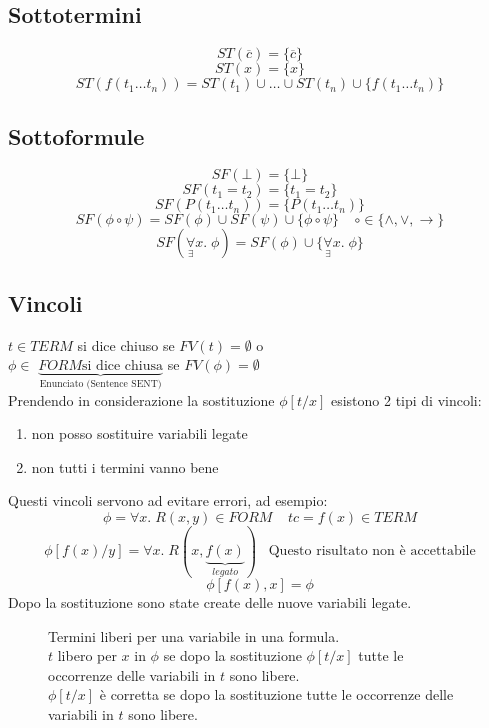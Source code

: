 \documentclass{article}
\theoremstyle{break}
\theoremstyle{break}
\theoremstyle{break}
\theoremstyle{break}
\begin{document}
\subsection{Sottotermini}
\[
  ST(\overline{c}) = \{\overline{c}\} 
\] 
\[
  ST(x) = \{x\} 
\] 
\[
  ST(f(t_1 \ldots t_n)) = ST(t_1) \cup \ldots \cup ST(t_n) \cup \{f(t_1 \ldots t_n)\} 
\] 
\subsection{Sottoformule}
\[
SF(\bot) = \{\bot\} 
\] 
\[
SF(t_1 = t_2) = \{t_1 = t_2\} 
\] 
\[
SF(P(t_1 \ldots t_n)) = \{P(t_1 \ldots t_n)\} 
\] 
\[
SF(\phi \circ \psi) = SF(\phi) \cup SF(\psi) \cup \{\phi \circ \psi\}\;\;\;\; \circ \in \{\wedge, \vee, \to \}  
\] 
\[
  SF(\underset{\exists}{\forall}x.\; \phi) = SF(\phi) \cup \{\underset{\exists}{\forall}x.\; \phi\}
\] 
\subsection{Vincoli}
\( t \in TERM \) si dice chiuso se \( FV(t) = \emptyset \) o\\
\( \phi \in \) \( \underbrace{ FORM  \text{si dice chiusa}}_{\text{Enunciato (Sentence SENT)}} \)  se \( FV(\phi) = \emptyset \)
\vspace{1em}\\
Prendendo in considerazione la sostituzione \( \phi[t/x] \) esistono 2 tipi di vincoli:
\begin{enumerate}
  \item non posso sostituire variabili legate
  \item non tutti i termini vanno bene
\end{enumerate}
Questi vincoli servono ad evitare errori, ad esempio:
\[
\phi = \forall x.\; R(x,y) \in FORM\;\;\;\;tc=f(x) \in TERM
\] 
\[
  \phi[f(x)/y] = \forall x.\; R(x, \underbrace{f(x)}_{legato})\;\;\; \text{Questo risultato non è accettabile}
\] 
\[
  \phi[f(x),x] = \phi
\] 
Dopo la sostituzione sono state create delle nuove variabili legate.
\begin{figure}[H]
  \begin{definition}
    Termini liberi per una variabile in una formula.
    \vspace{1em}\\
    \( t \) libero per \( x \) in \( \phi \) se dopo la sostituzione \( \phi[t/x] \) tutte
    le occorrenze delle variabili in \( t \) sono libere.
    \vspace{1em}\\
    \( \phi[t/x] \) è corretta se dopo la sostituzione tutte le occorrenze
    delle variabili in \( t \) sono libere.
  \end{definition}
\end{figure}
\end{document}
